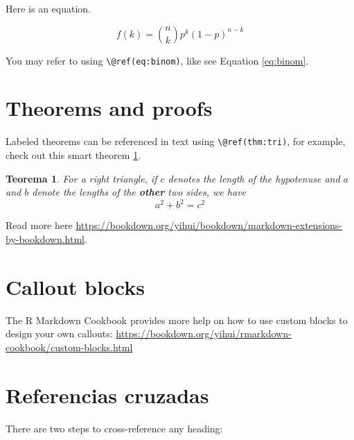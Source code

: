 \documentclass[
  20pt,
]{book}
\newtheorem{theorem}{Teorema}[chapter]
\theoremstyle{definition}
\theoremstyle{definition}
\theoremstyle{definition}
\theoremstyle{definition}
\theoremstyle{remark}
\begin{document}
Here is an equation.

\begin{equation} 
  f\left(k\right) = \binom{n}{k} p^k\left(1-p\right)^{n-k}
  \label{eq:binom}
\end{equation}

You may refer to using \texttt{\textbackslash{}@ref(eq:binom)}, like see Equation \eqref{eq:binom}.

\section{Theorems and proofs}\label{theorems-and-proofs}

Labeled theorems can be referenced in text using \texttt{\textbackslash{}@ref(thm:tri)}, for example, check out this smart theorem \ref{thm:tri}.

\begin{theorem}
\protect\hypertarget{thm:tri}{}\label{thm:tri}For a right triangle, if \(c\) denotes the \emph{length} of the hypotenuse
and \(a\) and \(b\) denote the lengths of the \textbf{other} two sides, we have
\[a^2 + b^2 = c^2\]
\end{theorem}

Read more here \url{https://bookdown.org/yihui/bookdown/markdown-extensions-by-bookdown.html}.

\section{Callout blocks}\label{callout-blocks}

The R Markdown Cookbook provides more help on how to use custom blocks to design your own callouts: \url{https://bookdown.org/yihui/rmarkdown-cookbook/custom-blocks.html}

\section{Referencias cruzadas}\label{referencias-cruzadas}

There are two steps to cross-reference any heading:
\end{document}
